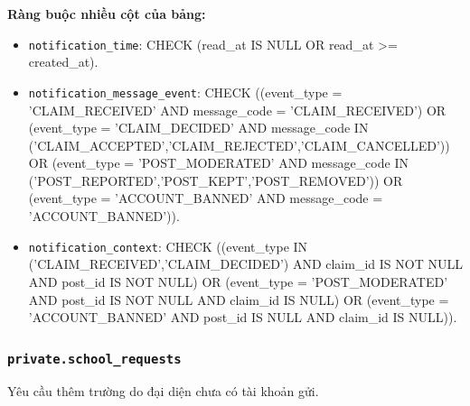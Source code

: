 \textbf{Ràng buộc nhiều cột của bảng:}

\begin{itemize}

\item \texttt{notification\_\allowbreak{}time}: CHECK (read\_\allowbreak{}at IS NULL OR read\_\allowbreak{}at >= created\_\allowbreak{}at).

\item \texttt{notification\_\allowbreak{}message\_\allowbreak{}event}: CHECK ((event\_\allowbreak{}type = 'CLAIM\_\allowbreak{}RECEIVED' AND message\_\allowbreak{}code = 'CLAIM\_\allowbreak{}RECEIVED') OR (event\_\allowbreak{}type = 'CLAIM\_\allowbreak{}DECIDED' AND message\_\allowbreak{}code IN ('CLAIM\_\allowbreak{}ACCEPTED',\allowbreak{}'CLAIM\_\allowbreak{}REJECTED',\allowbreak{}'CLAIM\_\allowbreak{}CANCELLED')) OR (event\_\allowbreak{}type = 'POST\_\allowbreak{}MODERATED' AND message\_\allowbreak{}code IN ('POST\_\allowbreak{}REPORTED',\allowbreak{}'POST\_\allowbreak{}KEPT',\allowbreak{}'POST\_\allowbreak{}REMOVED')) OR (event\_\allowbreak{}type = 'ACCOUNT\_\allowbreak{}BANNED' AND message\_\allowbreak{}code = 'ACCOUNT\_\allowbreak{}BANNED')).

\item \texttt{notification\_\allowbreak{}context}: CHECK ((event\_\allowbreak{}type IN ('CLAIM\_\allowbreak{}RECEIVED',\allowbreak{}'CLAIM\_\allowbreak{}DECIDED') AND claim\_\allowbreak{}id IS NOT NULL AND post\_\allowbreak{}id IS NOT NULL) OR (event\_\allowbreak{}type = 'POST\_\allowbreak{}MODERATED' AND post\_\allowbreak{}id IS NOT NULL AND claim\_\allowbreak{}id IS NULL) OR (event\_\allowbreak{}type = 'ACCOUNT\_\allowbreak{}BANNED' AND post\_\allowbreak{}id IS NULL AND claim\_\allowbreak{}id IS NULL)).

\end{itemize}

\subsubsection*{\texttt{private.school\_\allowbreak{}requests}}

Yêu cầu thêm trường do đại diện chưa có tài khoản gửi.

